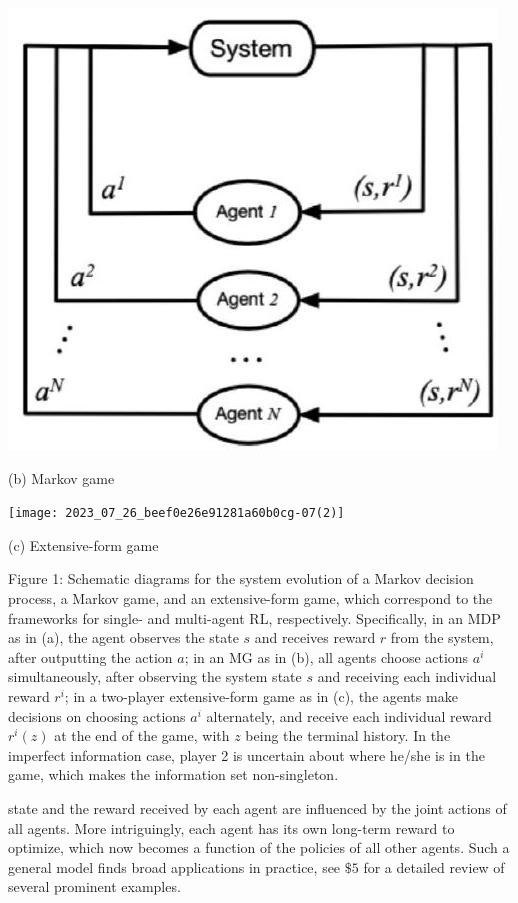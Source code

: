 \documentclass[10pt]{article}
\begin{document}
\begin{center}
\includegraphics[max width=\textwidth]{2023_07_26_beef0e26e91281a60b0cg-07}
\end{center}

(b) Markov game

\begin{center}
\texttt{[image: 2023\_07\_26\_beef0e26e91281a60b0cg-07(2)]}
\end{center}

(c) Extensive-form game

Figure 1: Schematic diagrams for the system evolution of a Markov decision process, a Markov game, and an extensive-form game, which correspond to the frameworks for single- and multi-agent RL, respectively. Specifically, in an MDP as in (a), the agent observes the state $s$ and receives reward $r$ from the system, after outputting the action $a$; in an MG as in (b), all agents choose actions $a^{i}$ simultaneously, after observing the system state $s$ and receiving each individual reward $r^{i}$; in a two-player extensive-form game as in (c), the agents make decisions on choosing actions $a^{i}$ alternately, and receive each individual reward $r^{i}(z)$ at the end of the game, with $z$ being the terminal history. In the imperfect information case, player 2 is uncertain about where he/she is in the game, which makes the information set non-singleton.

state and the reward received by each agent are influenced by the joint actions of all agents. More intriguingly, each agent has its own long-term reward to optimize, which now becomes a function of the policies of all other agents. Such a general model finds broad applications in practice, see $\$ 5$ for a detailed review of several prominent examples.
\end{document}
